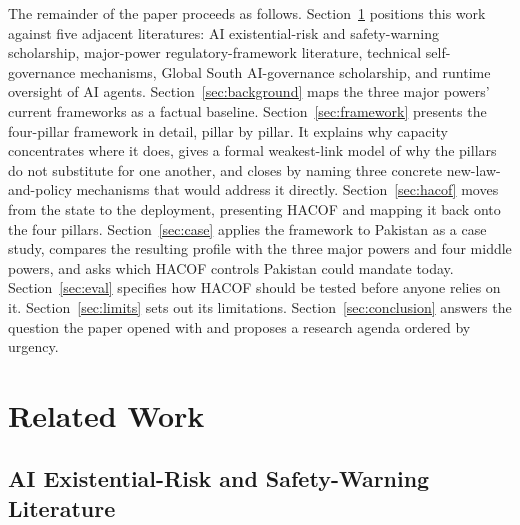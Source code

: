 \documentclass{ieeeaccess}
\newcommand{\hacof}{HACOF}
\begin{document}
The remainder of the paper proceeds as follows. Section~\ref{sec:related} positions this work against five adjacent literatures: AI existential-risk and safety-warning scholarship, major-power regulatory-framework literature, technical self-governance mechanisms, Global South AI-governance scholarship, and runtime oversight of AI agents. Section~\ref{sec:background} maps the three major powers' current frameworks as a factual baseline. Section~\ref{sec:framework} presents the four-pillar framework in detail, pillar by pillar. It explains why capacity concentrates where it does, gives a formal weakest-link model of why the pillars do not substitute for one another, and closes by naming three concrete new-law-and-policy mechanisms that would address it directly. Section~\ref{sec:hacof} moves from the state to the deployment, presenting \hacof{} and mapping it back onto the four pillars. Section~\ref{sec:case} applies the framework to Pakistan as a case study, compares the resulting profile with the three major powers and four middle powers, and asks which \hacof{} controls Pakistan could mandate today. Section~\ref{sec:eval} specifies how \hacof{} should be tested before anyone relies on it. Section~\ref{sec:limits} sets out its limitations. Section~\ref{sec:conclusion} answers the question the paper opened with and proposes a research agenda ordered by urgency.

\section{Related Work}
\label{sec:related}

\subsection{AI Existential-Risk and Safety-Warning Literature}
\end{document}
